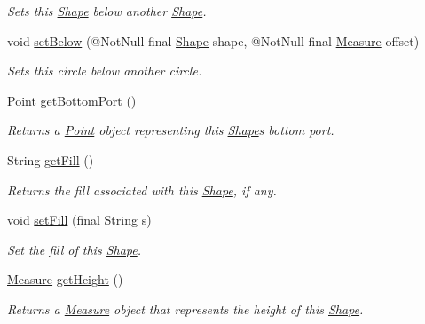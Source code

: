 \begin{DoxyCompactItemize}
\begin{DoxyCompactList}\small\item\em Sets this \hyperlink{classcom_1_1aarrelaakso_1_1drawl_1_1_shape}{Shape} below another \hyperlink{classcom_1_1aarrelaakso_1_1drawl_1_1_shape}{Shape}. \end{DoxyCompactList}\item 
void \hyperlink{classcom_1_1aarrelaakso_1_1drawl_1_1_shape_a63c902c4e79235901744c6d83544fa54}{set\+Below} (@Not\+Null final \hyperlink{classcom_1_1aarrelaakso_1_1drawl_1_1_shape}{Shape} shape, @Not\+Null final \hyperlink{classcom_1_1aarrelaakso_1_1drawl_1_1_measure}{Measure} offset)
\begin{DoxyCompactList}\small\item\em Sets this circle below another circle. \end{DoxyCompactList}\item 
\hyperlink{classcom_1_1aarrelaakso_1_1drawl_1_1_point}{Point} \hyperlink{classcom_1_1aarrelaakso_1_1drawl_1_1_shape_aba14efe9a16c0808580963c66b171082}{get\+Bottom\+Port} ()
\begin{DoxyCompactList}\small\item\em Returns a \hyperlink{classcom_1_1aarrelaakso_1_1drawl_1_1_point}{Point} object representing this \hyperlink{classcom_1_1aarrelaakso_1_1drawl_1_1_shape}{Shape}\textquotesingle{}s bottom port. \end{DoxyCompactList}\item 
String \hyperlink{classcom_1_1aarrelaakso_1_1drawl_1_1_shape_a0d9a33a3e151aaceeec140bea343a650}{get\+Fill} ()
\begin{DoxyCompactList}\small\item\em Returns the fill associated with this \hyperlink{classcom_1_1aarrelaakso_1_1drawl_1_1_shape}{Shape}, if any. \end{DoxyCompactList}\item 
void \hyperlink{classcom_1_1aarrelaakso_1_1drawl_1_1_shape_a81ff4feb49b8f74c1a639564748a23ee}{set\+Fill} (final String s)
\begin{DoxyCompactList}\small\item\em Set the fill of this \hyperlink{classcom_1_1aarrelaakso_1_1drawl_1_1_shape}{Shape}. \end{DoxyCompactList}\item 
\hyperlink{classcom_1_1aarrelaakso_1_1drawl_1_1_measure}{Measure} \hyperlink{classcom_1_1aarrelaakso_1_1drawl_1_1_shape_ac9f74d31c332aab76b329edc22080e67}{get\+Height} ()
\begin{DoxyCompactList}\small\item\em Returns a \hyperlink{classcom_1_1aarrelaakso_1_1drawl_1_1_measure}{Measure} object that represents the height of this \hyperlink{classcom_1_1aarrelaakso_1_1drawl_1_1_shape}{Shape}. \end{DoxyCompactList}\item 

\end{DoxyCompactItemize}

